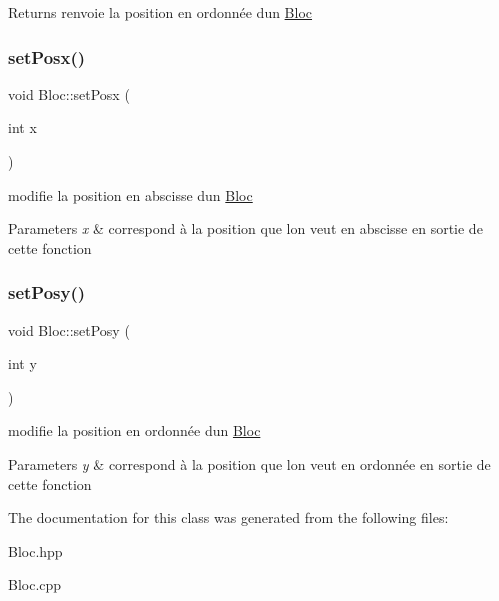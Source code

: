 \begin{DoxyReturn}{Returns}
renvoie la position en ordonnée d\textquotesingle{}un \hyperlink{classBloc}{Bloc} 
\end{DoxyReturn}
\mbox{\label{classBloc_a2d50fb680c5b8d3d3de2566a125d25a2}} 
\subsubsection{\texorpdfstring{set\+Posx()}{setPosx()}}
{\footnotesize\ttfamily void Bloc\+::set\+Posx (\begin{DoxyParamCaption}\item[{int}]{x }\end{DoxyParamCaption})}



modifie la position en abscisse d\textquotesingle{}un \hyperlink{classBloc}{Bloc} 


\begin{DoxyParams}{Parameters}
{\em x} & correspond à la position que l\textquotesingle{}on veut en abscisse en sortie de cette fonction \\
\hline
\end{DoxyParams}
\mbox{\label{classBloc_a361647f817b1f6202ee29c77e8f03f79}} 
\subsubsection{\texorpdfstring{set\+Posy()}{setPosy()}}
{\footnotesize\ttfamily void Bloc\+::set\+Posy (\begin{DoxyParamCaption}\item[{int}]{y }\end{DoxyParamCaption})}



modifie la position en ordonnée d\textquotesingle{}un \hyperlink{classBloc}{Bloc} 


\begin{DoxyParams}{Parameters}
{\em y} & correspond à la position que l\textquotesingle{}on veut en ordonnée en sortie de cette fonction \\
\hline
\end{DoxyParams}


The documentation for this class was generated from the following files\+:\begin{DoxyCompactItemize}
\item 
Bloc.\+hpp\item 
Bloc.\+cpp\end{DoxyCompactItemize}
